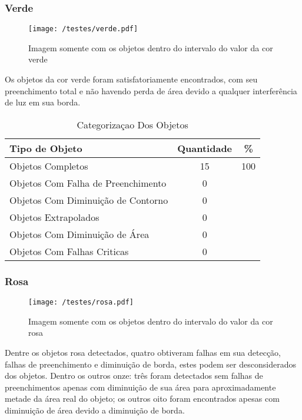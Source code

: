 \subsubsection{Verde}
\begin{figure}[H]
		\centering
		\texttt{[image: /testes/verde.pdf]}
		\caption{Imagem somente com os objetos dentro do intervalo do valor da cor verde}
		\label{disposicaoparte}
	\end{figure}

Os objetos da cor verde foram satisfatoriamente encontrados, com seu preenchimento total e não havendo perda de área devido a qualquer interferência de luz em sua borda.	
	
\begin{table}[h]
\centering
\begin{tabular}{l|c|c}
Tipo de Objeto & Quantidade & \% \\ %
\hline                               %
Objetos Completos &  15 &100 \\
\hline 
Objetos Com Falha de Preenchimento & 0\\
\hline 
Objetos Com Diminuição de Contorno &  0\\
\hline 
Objetos Extrapolados & 0 \\
\hline 
Objetos Com Diminuição de Área &  0 \\
\hline 
Objetos Com Falhas Criticas & 0 \\
\hline 
\end{tabular}
\caption{Categorizaçao Dos Objetos}
\end{table}	
\subsubsection{Rosa}
	
	\begin{figure}[H]
		\centering
		\texttt{[image: /testes/rosa.pdf]}
		\caption{Imagem somente com os objetos dentro do intervalo do valor da cor rosa}
		\label{disposicaoparte}
	\end{figure}
	
Dentre os objetos rosa detectados, quatro obtiveram falhas em sua detecção, falhas de preenchimento e diminuição de borda, estes podem ser desconsiderados dos objetos. Dentro os outros onze: três foram detectados sem falhas de preenchimentos apenas com diminuição de sua área para aproximadamente metade da área real do objeto; os outros oito foram encontrados apesas com diminuição de área devido a diminuição de borda.
	

